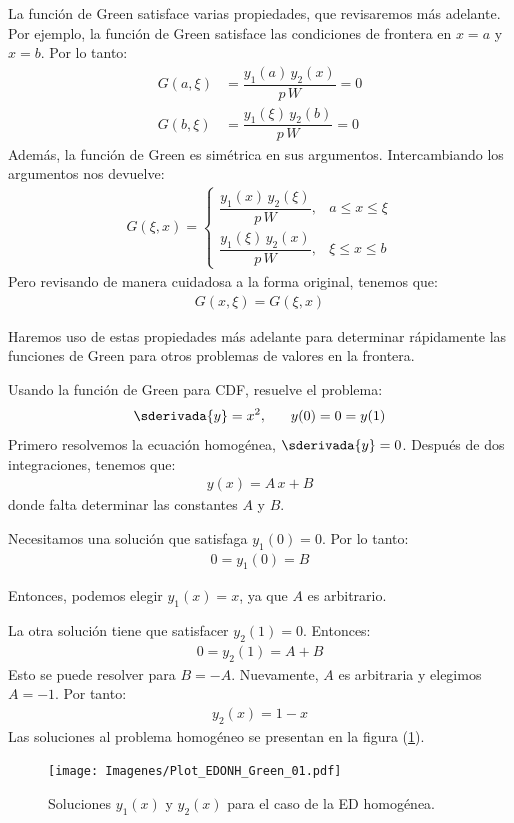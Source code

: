 La función de Green satisface varias propiedades, que revisaremos más adelante. Por ejemplo, la función de Green satisface las condiciones de frontera en $x = a$ y $x = b$. Por lo tanto:
\begin{align*}
G (a, \xi) &= \dfrac{y_{1} (a) \, y_{2} (x)}{p \, W} = 0 \\[0.5em]        
G (b, \xi) &= \dfrac{y_{1} (\xi) \, y_{2} (b)}{p \, W} = 0
\end{align*}
Además, la función de Green es simétrica en sus argumentos. Intercambiando los argumentos nos devuelve:
\begin{align}
G (\xi, x) = \begin{cases}
\dfrac{y_{1} (x) \, y_{2} (\xi)}{p \, W}, & a \leq x \leq \xi \\[0.5em]
\dfrac{y_{1} (\xi) \, y_{2} (x)}{p \, W}, & \xi \leq x \leq b
\end{cases}
\label{eq:ecuacion_07_34}
\end{align}    
Pero revisando de manera cuidadosa a la forma original, tenemos que:
\begin{align*}
G (x, \xi) = G (\xi, x)
\end{align*}

Haremos uso de estas propiedades más adelante para determinar rápidamente las funciones de Green para otros problemas de valores en la frontera.

\begin{ejemplo}
Usando la función de Green para CDF, resuelve el problema:
\begin{align*}
\sderivada{y} = x^{2}, \hspace{0.6cm} y (0) = 0 = y (1)
\end{align*}
Primero resolvemos la ecuación homogénea, $\sderivada{y} = 0$. Después de dos integraciones, tenemos que:
\begin{align*}
y (x) = A \, x + B
\end{align*}
donde falta determinar las constantes $A$ y $B$.
\par
Necesitamos una solución que satisfaga $y_{1} (0) = 0$. Por lo tanto:
\begin{align*}
0 = y_{1} (0) = B
\end{align*}

\end{ejemplo}
Entonces, podemos elegir $y_{1} (x) = x$, ya que $A$ es arbitrario.
\par
La otra solución tiene que satisfacer $y_{2} (1) = 0$. Entonces:
\begin{align*}
0 = y_{2} (1) = A + B
\end{align*}
Esto se puede resolver para $B = - A$. Nuevamente, $A$ es arbitraria y elegimos $A = - 1$. Por tanto:
\begin{align*}
y_{2} (x) = 1 - x
\end{align*}
Las soluciones al problema homogéneo se presentan en la figura (\ref{fig:figura_03}).
\begin{figure}[H]
    \centering
    \texttt{[image: Imagenes/Plot\_EDONH\_Green\_01.pdf]}
    \caption{Soluciones $y_{1} (x)$ y $y_{2} (x)$ para el caso de la ED homogénea.}
    \label{fig:figura_03}
\end{figure}

